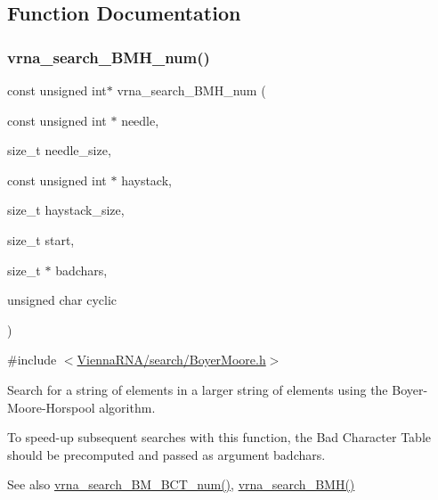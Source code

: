 \subsection{Function Documentation}
\mbox{\label{group__search__utils_ga8af89ab58905851f3dbd52624227d372}} 
\subsubsection{\texorpdfstring{vrna\+\_\+search\+\_\+\+B\+M\+H\+\_\+num()}{vrna\_search\_BMH\_num()}}
{\footnotesize\ttfamily const unsigned int$\ast$ vrna\+\_\+search\+\_\+\+B\+M\+H\+\_\+num (\begin{DoxyParamCaption}\item[{const unsigned int $\ast$}]{needle,  }\item[{size\+\_\+t}]{needle\+\_\+size,  }\item[{const unsigned int $\ast$}]{haystack,  }\item[{size\+\_\+t}]{haystack\+\_\+size,  }\item[{size\+\_\+t}]{start,  }\item[{size\+\_\+t $\ast$}]{badchars,  }\item[{unsigned char}]{cyclic }\end{DoxyParamCaption})}



{\ttfamily \#include $<$\hyperlink{BoyerMoore_8h}{Vienna\+R\+N\+A/search/\+Boyer\+Moore.\+h}$>$}



Search for a string of elements in a larger string of elements using the Boyer-\/\+Moore-\/\+Horspool algorithm. 

To speed-\/up subsequent searches with this function, the Bad Character Table should be precomputed and passed as argument {\ttfamily badchars}.

\begin{DoxySeeAlso}{See also}
\hyperlink{group__search__utils_gad315a442e099c86c5dbf6c1c7933223d}{vrna\+\_\+search\+\_\+\+B\+M\+\_\+\+B\+C\+T\+\_\+num()}, \hyperlink{group__search__utils_ga72574a7cf9786d825ce73f7f7748d3c4}{vrna\+\_\+search\+\_\+\+B\+M\+H()}
\end{DoxySeeAlso}

